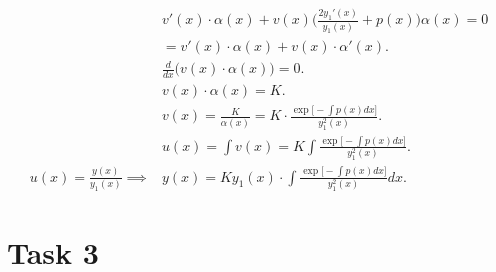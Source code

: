 \documentclass[]{article}
\begin{document}
\begin{align*}
    &v'(x)\cdot\alpha(x) + v(x)\Big(\frac{2y_1'(x)}{y_1(x)} + p(x)\Big)\alpha(x) = 0\\
    &=v'(x)\cdot\alpha(x) + v(x)\cdot\alpha'(x).\\
    &\frac{d}{dx}\Big(v(x)\cdot\alpha(x)\Big)=0.\\
    &v(x)\cdot\alpha(x) = K.\\
    &v(x) = \frac{K}{\alpha(x)} = K \cdot \frac{\exp\Bigg[-\int p(x)dx\Bigg]}{y_1^2(x)}.\\
    &u(x) = \int v(x)= K\int \frac{\exp\Big[-\int p(x)dx\Big]}{y_1^2(x)}.\\
    u(x)=\frac{y(x)}{y_1(x)}\implies& y(x) = Ky_1(x)\cdot\int \frac{\exp\Big[-\int p(x)dx\Big]}{y_1^2(x)}dx.
\end{align*}

\section*{Task 3}
\end{document}
